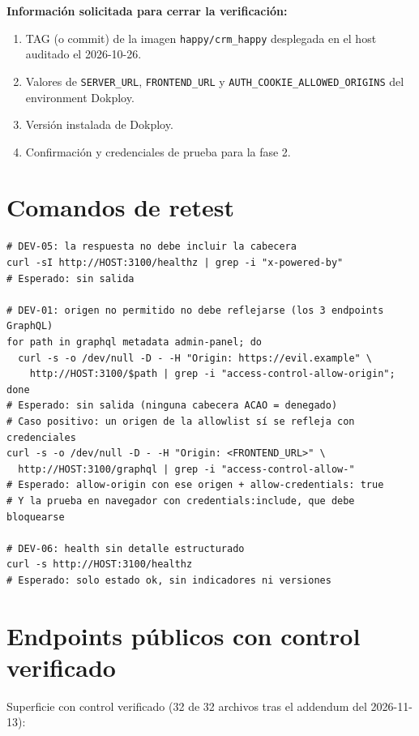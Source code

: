 \documentclass[11pt,a4paper]{article}
\begin{document}
\textbf{Información solicitada para cerrar la verificación:}
\begin{enumerate}
\item TAG (o commit) de la imagen \texttt{happy/crm\_happy} desplegada en el host
auditado el 2026-10-26.
\item Valores de \texttt{SERVER\_URL}, \texttt{FRONTEND\_URL} y
\texttt{AUTH\_COOKIE\_ALLOWED\_ORIGINS} del environment Dokploy.
\item Versión instalada de Dokploy.
\item Confirmación y credenciales de prueba para la fase 2.
\end{enumerate}

\appendix
\section{Comandos de retest}

\begin{lstlisting}[style=sh]
# DEV-05: la respuesta no debe incluir la cabecera
curl -sI http://HOST:3100/healthz | grep -i "x-powered-by"
# Esperado: sin salida

# DEV-01: origen no permitido no debe reflejarse (los 3 endpoints GraphQL)
for path in graphql metadata admin-panel; do
  curl -s -o /dev/null -D - -H "Origin: https://evil.example" \
    http://HOST:3100/$path | grep -i "access-control-allow-origin";
done
# Esperado: sin salida (ninguna cabecera ACAO = denegado)
# Caso positivo: un origen de la allowlist sí se refleja con credenciales
curl -s -o /dev/null -D - -H "Origin: <FRONTEND_URL>" \
  http://HOST:3100/graphql | grep -i "access-control-allow-"
# Esperado: allow-origin con ese origen + allow-credentials: true
# Y la prueba en navegador con credentials:include, que debe bloquearse

# DEV-06: health sin detalle estructurado
curl -s http://HOST:3100/healthz
# Esperado: solo estado ok, sin indicadores ni versiones
\end{lstlisting}

\section{Endpoints públicos con control verificado}

Superficie con control verificado (32 de 32 archivos tras el addendum del
2026-11-13):
\end{document}
